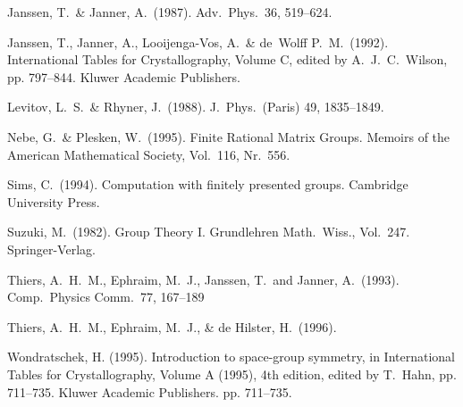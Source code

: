 \documentclass[12pt]{amsart}
\let\nwline=\newline
\renewcommand{\newline}{\nwline\mbox{}}
\begin{document}
\begin{thebibliography}{}
   Janssen, T.\ \& Janner, A.\ (1987).
   Adv.\ Phys.\ 36, 519--624.

   Janssen, T., Janner, A., Looijenga-Vos, A.\ \& de~Wolff P.~M.\ (1992).
   \newline\qquad
   International Tables for Crystallography, Volume C, edited by
   A.~J.~C.~Wilson, pp. 797--844. 
   \newline\qquad
   Kluwer Academic Publishers.

   Levitov, L.~S.\ \& Rhyner, J.\ (1988).
   J.\ Phys.\ (Paris) 49, 1835--1849.

   Nebe, G.\ \& Plesken, W.\ (1995).
   Finite Rational Matrix Groups.
   Memoirs of the American Mathematical Society, Vol.\ 116, Nr.\ 556.

   Sims, C.\ (1994).
   Computation with finitely presented groups.
   Cambridge University Press.

   Suzuki, M.\ (1982).
   Group Theory I. 
   Grundlehren Math.\ Wiss., Vol.\ 247.
   Springer-Verlag.

   Thiers, A.~H.~M., Ephraim, M.~J., Janssen, T.\ and Janner, A.\ (1993).
   \newline\qquad
   Comp.\ Physics Comm.\ 77, 167--189

   Thiers, A.~H.~M., Ephraim, M.~J., \& de Hilster, H.\ (1996).
   \newline{}

   Wondratschek, H. (1995).
   Introduction to space-group symmetry, in International Tables for 
   \newline\qquad
   Crystallography, Volume A (1995),
   4th edition, edited by T.\ Hahn, pp. 711--735. 
   \newline\qquad
   Kluwer Academic Publishers. pp. 711--735.

\end{thebibliography}


\ifx\undefined\bysame
\newcommand{\bysame}{\leavevmode\hbox to3em{\hrulefill}\,}
\fi
\end{document}
